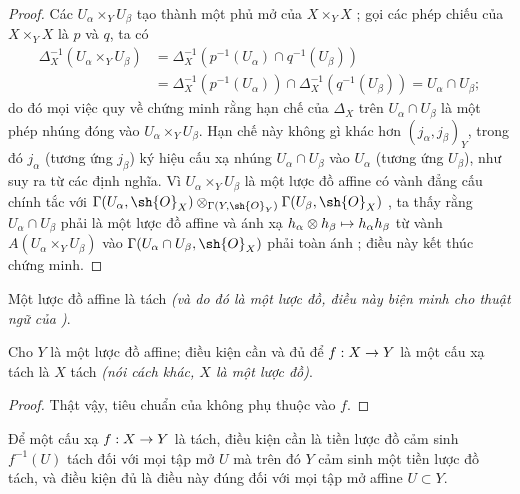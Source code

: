 \documentclass[oneside]{amsart}
\makeatletter
\newcommand{\ega@arrow}[2]{\mathchoice{#1}{#2}{#2}{#2}}
\let\ega@shortmapsto\mapsto
\renewcommand{\to}{\ega@arrow{\longrightarrow}{\rightarrow}}
\renewcommand{\mapsto}{\ega@arrow{\longmapsto}{\ega@shortmapsto}}
\let\EGAOriginalLabel\label
\renewcommand{\label}[1]{\phantomsection\EGAOriginalLabel{#1}}
\makeatother
\begin{document}
\begin{proof}
Các $U_\alpha\times_Y U_\beta$ tạo thành một phủ mở của $X\times_Y X$
; gọi các phép chiếu của $X\times_Y X$ là $p$ và $q$, ta có
\begin{align*}
  \Delta_X^{-1}(U_\alpha\times_Y U_\beta)&=\Delta_X^{-1}(p^{-1}(U_\alpha)\cap q^{-1}(U_\beta))\\
                                         &=\Delta_X^{-1}(p^{-1}(U_\alpha))\cap\Delta_X^{-1}(q^{-1}(U_\beta))=U_\alpha\cap U_\beta;
\end{align*}
do đó mọi việc quy về chứng minh rằng hạn chế của $\Delta_X$ trên
$U_\alpha\cap U_\beta$ là một phép nhúng đóng vào
$U_\alpha\times_Y U_\beta$.
Hạn chế này không gì khác hơn $(j_\alpha,j_\beta)_Y$, trong đó $j_\alpha$
(tương ứng $j_\beta$) ký hiệu cấu xạ nhúng
$U_\alpha\cap U_\beta$ vào $U_\alpha$ (tương ứng $U_\beta$), như suy ra từ
các định nghĩa.
Vì $U_\alpha\times_Y U_\beta$ là một lược đồ affine có vành đẳng cấu chính
tắc với
$\Gamma(U_\alpha,\sh{O}_X)\otimes_{\Gamma(Y,\sh{O}_Y)}\Gamma(U_\beta,\sh{O}_X)$
, ta thấy rằng $U_\alpha\cap U_\beta$ phải là một lược đồ affine
và ánh xạ $h_\alpha\otimes h_\beta\mapsto h_\alpha h_\beta$ từ vành
$A(U_\alpha\times_Y U_\beta)$ vào
$\Gamma(U_\alpha\cap U_\beta,\sh{O}_X)$ phải toàn ánh
; điều này kết thúc chứng minh.
\end{proof}

\begin{corollary}[5.5.7]
\label{I.5.5.7}
Một lược đồ affine là tách \emph{(và do đó là một \emph{lược đồ}, điều này
biện minh cho thuật ngữ của )}.
\end{corollary}

\begin{corollary}[5.5.8]
\label{I.5.5.8}
Cho $Y$ là một lược đồ affine; điều kiện cần và đủ để $f:X\to Y$ là một cấu xạ
tách là $X$ tách \emph{(nói cách khác, $X$ là một \emph{lược đồ})}.
\end{corollary}

\begin{proof}
Thật vậy, tiêu chuẩn của  không phụ thuộc vào $f$.
\end{proof}

\begin{corollary}[5.5.9]
\label{I.5.5.9}
Để một cấu xạ $f:X\to Y$ là tách, điều kiện cần là tiền lược đồ cảm sinh
$f^{-1}(U)$ tách đối với mọi tập mở $U$ mà trên đó $Y$ cảm sinh một tiền lược
đồ tách, và điều kiện đủ là điều này đúng đối với mọi tập mở affine
$U\subset Y$.
\end{corollary}
\end{document}
